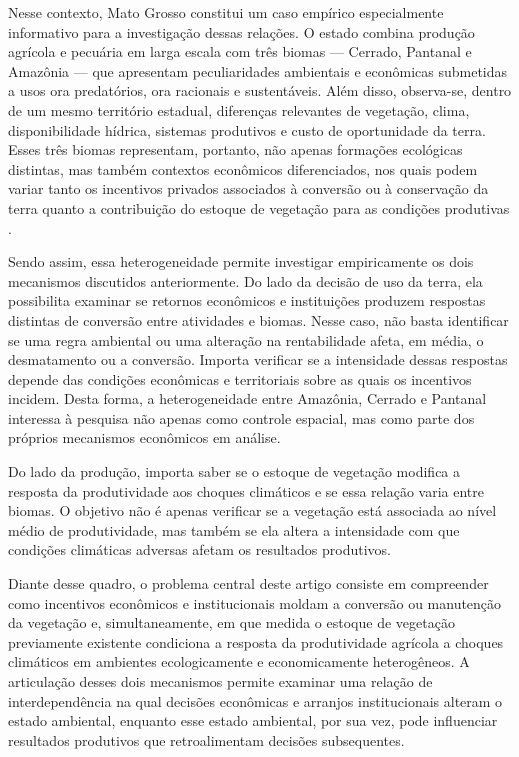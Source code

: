 Nesse contexto, Mato Grosso constitui um caso empírico especialmente informativo para a investigação dessas relações. O estado combina produção agrícola e pecuária em larga escala com três biomas — Cerrado, Pantanal e Amazônia — que apresentam peculiaridades ambientais e econômicas submetidas a usos ora predatórios, ora racionais e sustentáveis. Além disso, observa-se, dentro de um mesmo território estadual, diferenças relevantes de vegetação, clima, disponibilidade hídrica, sistemas produtivos e custo de oportunidade da terra. Esses três biomas representam, portanto, não apenas formações ecológicas distintas, mas também contextos econômicos diferenciados, nos quais podem variar tanto os incentivos privados associados à conversão ou à conservação da terra quanto a contribuição do estoque de vegetação para as condições produtivas \cite{VanWeyEtAl2013,SimoesEtAl2020}.

Sendo assim, essa heterogeneidade permite investigar empiricamente os dois mecanismos discutidos anteriormente. Do lado da decisão de uso da terra, ela possibilita examinar se retornos econômicos e instituições produzem respostas distintas de conversão entre atividades e biomas. Nesse caso, não basta identificar se uma regra ambiental ou uma alteração na rentabilidade afeta, em média, o desmatamento ou a conversão. Importa verificar se a intensidade dessas respostas depende das condições econômicas e territoriais sobre as quais os incentivos incidem. Desta forma, a heterogeneidade entre Amazônia, Cerrado e Pantanal interessa à pesquisa não apenas como controle espacial, mas como parte dos próprios mecanismos econômicos em análise.

Do lado da produção, importa saber se o estoque de vegetação modifica a resposta da produtividade aos choques climáticos e se essa relação varia entre biomas. O objetivo não é apenas verificar se a vegetação está associada ao nível médio de produtividade, mas também se ela altera a intensidade com que condições climáticas adversas afetam os resultados produtivos.


Diante desse quadro, o problema central deste artigo consiste em compreender como incentivos econômicos e institucionais moldam a conversão ou manutenção da vegetação e, simultaneamente, em que medida o estoque de vegetação previamente existente condiciona a resposta da produtividade agrícola a choques climáticos em ambientes ecologicamente e economicamente heterogêneos. A articulação desses dois mecanismos permite examinar uma relação de interdependência na qual decisões econômicas e arranjos institucionais alteram o estado ambiental, enquanto esse estado ambiental, por sua vez, pode influenciar resultados produtivos que retroalimentam decisões subsequentes.


